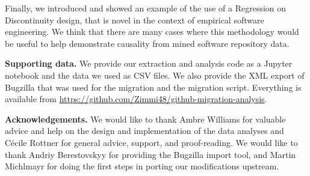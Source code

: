 \documentclass[conference]{IEEEtran}
\begin{document}
Finally, we introduced and showed an example of the use of a Regression on Discontinuity design, that is novel in the context of empirical software engineering. We think that there are many cases where this methodology would be useful to help demonstrate causality from mined software repository data.


\scriptsize
\noindent \footnotesize{\textbf{Supporting data.}}
We provide our extraction and analysis code as a Jupyter notebook and the data we used as CSV files. We also provide the XML export of Bugzilla that was used for the migration and the migration script. Everything is available from \url{https://github.com/Zimmi48/github-migration-analysis}.


\noindent\footnotesize{\textbf{Acknowledgements.}}
We would like to thank Ambre Williams for valuable advice and help on the design and implementation of the data analyses and C\'ecile Rottner for general advice, support, and proof-reading.
We would like to thank Andriy Berestovskyy for providing the Bugzilla import tool, and Martin Michlmayr for doing the first steps in porting our modifications upstream.

%


%
\end{document}
